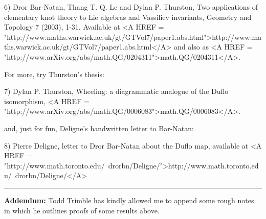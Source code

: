 6) Dror Bar-Natan, Thang T. Q. Le and Dylan P. Thurston, Two
applications of elementary knot theory to Lie algebras and Vassiliev
invariants, Geometry and Topology 7 (2003), 1-31.  Available at
<A HREF = "http://www.maths.warwick.ac.uk/gt/GTVol7/paper1.abs.html">http://www.maths.warwick.ac.uk/gt/GTVol7/paper1.abs.html</A> 
and also
as <A HREF = "http://www.arXiv.org/abs/math.QG/0204311">math.QG/0204311</A>.

For more, try Thurston's thesis:

7) Dylan P. Thurston, Wheeling: a diagrammatic analogue of the Duflo
isomorphism, <A HREF = "http://www.arXiv.org/abs/math.QG/0006083">math.QG/0006083</A>.

and, just for fun, Deligne's handwritten letter to Bar-Natan:

8) Pierre Deligne, letter to Dror Bar-Natan about the Duflo map,
available at <A HREF = "http://www.math.toronto.edu/~drorbn/Deligne/">http://www.math.toronto.edu/~drorbn/Deligne/</A>

\par\noindent\rule{\textwidth}{0.4pt}
\textbf{Addendum:} Todd Trimble has kindly allowed me to append
some rough notes in which he outlines proofs of some results
above.



